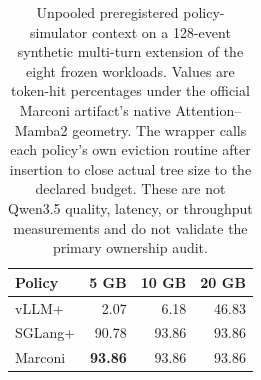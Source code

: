\begin{table}[H]
  \caption{Unpooled preregistered policy-simulator context on a 128-event synthetic
  multi-turn extension of the eight frozen workloads. Values are token-hit
  percentages under the official Marconi artifact's native
  Attention--Mamba2 geometry. The wrapper calls each policy's own eviction
  routine after insertion to close actual tree size to the declared budget.
  These are not Qwen3.5 quality, latency, or throughput measurements and do
  not validate the primary ownership audit.}
  \label{tab:marconi-policy-context}
  \centering\small
  \begin{tabular}{@{}lrrr@{}}
    \toprule
    Policy & 5 GB & 10 GB & 20 GB \\
    \midrule
    vLLM+ & 2.07 & 6.18 & 46.83 \\
    SGLang+ & 90.78 & 93.86 & 93.86 \\
    Marconi & \textbf{93.86} & 93.86 & 93.86 \\
    \bottomrule
  \end{tabular}
\end{table}
